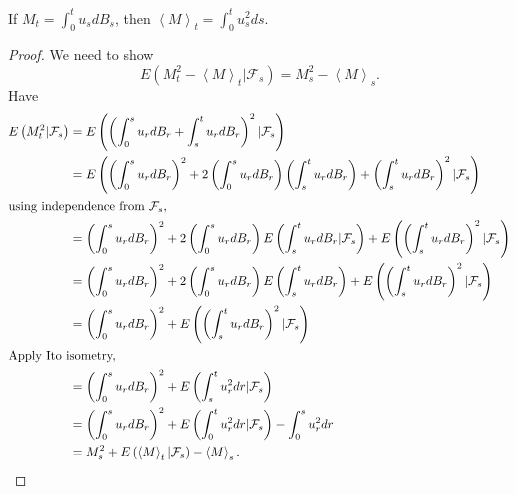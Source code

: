 
\begin{claim}
	If $M_t = \int _0^t u_s d B_s$, then $\left\langle M \right\rangle _t = \int _0^t u_s^2 d s$.
\end{claim}
\begin{proof}
	We need to show
	\[
		E\left( M_t^2 - \left\langle M \right\rangle _t | \mathcal{F}_s \right)  = M_s^2 - \left\langle M \right\rangle _s
	.\] 
	Have
	\begin{align*}
		E\left( M_t^2 | \mathcal{F}_s \right) 
		&= E\left(\left( \int _0^s u_r d B_r + \int _s^t u_r d B_r \right) ^2 | \mathcal{F}_s\right) \\
		&= E\left( \left(\int _0^s u_r d B_r \right)^2 + 2\left( \int _0^s u_r d B_r \right) \left( \int _s^t u_r d B_r \right)  + \left( \int _s^t u_r d B_r \right) ^2 | \mathcal{F}_s\right)  \\
		\intertext{using independence from $\mathcal{F}_s$,}
		&= \left(\int _0^s u_r d B_r \right)^2 + 2 \left( \int _0^s u_r d B_r \right) E\left( \int _s^t u_r d B_r | \mathcal{F}_s\right)  + E\left(\left( \int _s^t u_r d B_r \right) ^2 | \mathcal{F}_s\right)  \\
		&= \left(\int _0^s u_r d B_r \right)^2 + 2 \left( \int _0^s u_r d B_r \right) E\left( \int _s^t u_r d B_r \right)  + E\left(\left( \int _s^t u_r d B_r \right) ^2 | \mathcal{F}_s\right)  \\
		&= \left(\int _0^s u_r d B_r \right)^2 + E\left(\left( \int _s^t u_r d B_r \right) ^2 | \mathcal{F}_s\right)  \\
		\intertext{Apply Ito isometry,}
		&= \left(\int _0^s u_r d B_r \right)^2 + E\left( \int _s^t u_r^2 d r | \mathcal{F}_s\right)  \\
		&= \left( \int _0^s u_r d B_r \right) ^2 + E\left( \int _0^t u_r^2 d  r | \mathcal{F}_s \right)  - \int _0^s u_r^2 d r \\
		&= M_s^2 + E\left( \left\langle M \right\rangle _t | \mathcal{F}_s \right)  - \left\langle M \right\rangle _s
	.\end{align*}

\end{proof}


